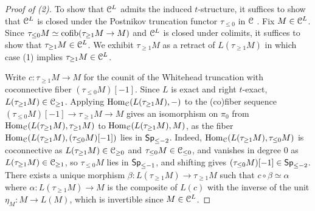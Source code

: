 \begin{proof}[Proof of (2)]
    To show that $\EuScript{C}^{L}$ admits the induced $t$-structure, it suffices to show that $\EuScript{C}^{L}$ is closed under the Postnikov truncation functor $\tau_{\leq0}$ in $\EuScript{C}$ \cite[\S 1.3.19 \& \S 2]{Perverse}. Fix $M\in\EuScript{C}^{L}$. Since $\tau_{\leq0}M\simeq\mathrm{cofib}(\tau_{\geq 1}M\to M)$ and $\EuScript{C}^{L}$ is closed under colimits, it suffices to show that $\tau_{\geq 1}M\in\EuScript{C}^{L}$. We exhibit $\tau_{\geq 1}M$ as a retract of $L(\tau_{\geq 1}M)$ in which case (1) implies $\tau_{\geq 1}M\in\EuScript{C}^{L}$. 

    Write $c:\tau_{\geq 1}M\to M$ for the counit of the Whitehead truncation with coconnective fiber $(\tau_{\leq 0}M)[-1]$. Since $L$ is exact and right $t$-exact, $L(\tau_{\geq 1}M)\in\EuScript{C}_{\geq 1}$. Applying $\mathrm{Hom}_{\EuScript{C}}(L(\tau_{\geq 1}M),-)$ to the (co)fiber sequence $(\tau_{\leq 0}M)[-1]\to\tau_{\geq 1}M\to M$ gives an isomorphism on $\pi_{0}$ from $\mathrm{Hom}_{\EuScript{C}}(L(\tau_{\geq 1}M),\tau_{\geq 1}M)$ to $\mathrm{Hom}_{\EuScript{C}}(L(\tau_{\geq 1}M),M)$, as the fiber $\mathrm{Hom}_{\EuScript{C}}(L(\tau_{\geq 1}M),(\tau_{\leq0}M)[-1])$ lies in $\mathsf{Sp}_{\leq -2}$. Indeed, $\mathrm{Hom}_{\EuScript{C}}(L(\tau_{\geq 1}M),\tau_{\leq 0}M)$ is coconnective as $L(\tau_{\geq 1}M)\in\EuScript{C}_{\geq 0}$ and $\tau_{\leq 0}M\in\EuScript{C}_{\leq 0}$, and vanishes in degree $0$ as $L(\tau_{\geq 1}M)\in\EuScript{C}_{\geq 1}$, so $\tau_{\leq0}M$ lies in $\mathsf{Sp}_{\leq -1}$, and shifting gives $(\tau_{\leq0}M)[-1]\in\mathsf{Sp}_{\leq -2}$. There exists a unique morphism $\beta:L(\tau_{\geq 1}M)\to \tau_{\geq 1}M$ such that $c\circ\beta\simeq\alpha$ where $\alpha:L(\tau_{\geq 1}M)\to M$ is the composite of $L(c)$ with the inverse of the unit $\eta_{M}:M\to L(M)$, which is invertible since $M\in\EuScript{C}^{L}$. 


\end{proof}
